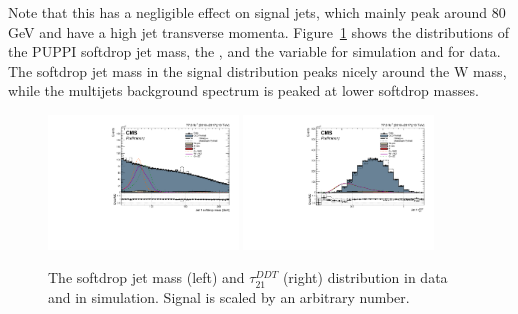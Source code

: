  Note that this has a negligible effect on signal jets, which mainly peak around 80 GeV and have a high jet transverse momenta.
Figure~\ref{fig:wtagCP} shows the distributions of the PUPPI softdrop jet mass, the \ddt, and the \nsubj variable for simulation and for data. The softdrop jet mass in the signal distribution peaks nicely around the W mass, while the multijets background spectrum is peaked at lower softdrop masses.
\begin{figure}[h!]
\centering
\includegraphics[width=0.450\textwidth]{figures/analysis/search3/B2G-18-002/looseSel_Jet_1_softdrop_mass.pdf}
\includegraphics[width=0.450\textwidth]{figures/analysis/search3/B2G-18-002/looseSel_Jet_1_DDT.pdf}\\
\caption{The softdrop jet mass (left) and $\tau_{21}^{DDT}$ (right) distribution in data and in simulation. Signal is scaled by an arbitrary number.}
\label{fig:wtagCP}
\end{figure}
\clearpage
